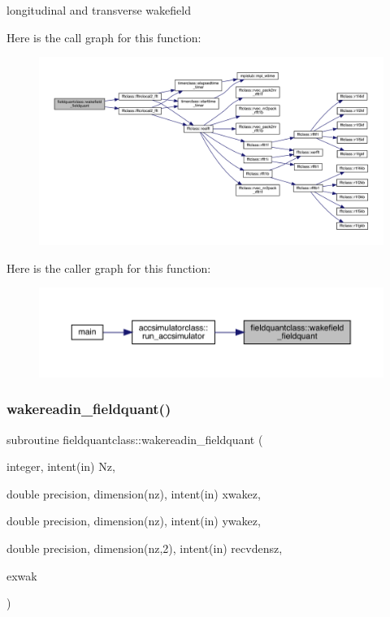 longitudinal and transverse wakefield 

Here is the call graph for this function\+:\nopagebreak
\begin{figure}[H]
\begin{center}
\leavevmode
\includegraphics[width=350pt]{namespacefieldquantclass_a61fa5f8980736fbc19fa50224214727b_cgraph}
\end{center}
\end{figure}
Here is the caller graph for this function\+:\nopagebreak
\begin{figure}[H]
\begin{center}
\leavevmode
\includegraphics[width=350pt]{namespacefieldquantclass_a61fa5f8980736fbc19fa50224214727b_icgraph}
\end{center}
\end{figure}
\mbox{\label{namespacefieldquantclass_afc918d38222797f1f06903259e48461b}} 
\subsubsection{\texorpdfstring{wakereadin\_fieldquant()}{wakereadin\_fieldquant()}}
{\footnotesize\ttfamily subroutine fieldquantclass\+::wakereadin\+\_\+fieldquant (\begin{DoxyParamCaption}\item[{integer, intent(in)}]{Nz,  }\item[{double precision, dimension(nz), intent(in)}]{xwakez,  }\item[{double precision, dimension(nz), intent(in)}]{ywakez,  }\item[{double precision, dimension(nz,2), intent(in)}]{recvdensz,  }\item[{}]{exwak }\end{DoxyParamCaption})}



